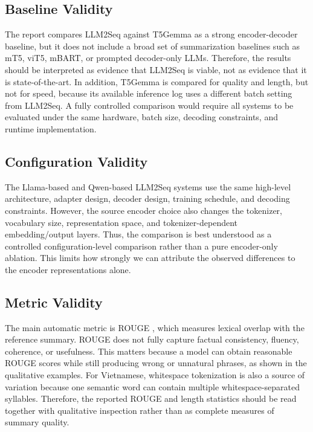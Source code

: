 \documentclass[11pt]{article}
\begin{document}
\subsection{Baseline Validity}

The report compares LLM2Seq against T5Gemma as a strong encoder-decoder baseline, but it does not include a broad set of summarization baselines such as mT5, viT5, mBART, or prompted decoder-only LLMs.
Therefore, the results should be interpreted as evidence that LLM2Seq is viable, not as evidence that it is state-of-the-art.
In addition, T5Gemma is compared for quality and length, but not for speed, because its available inference log uses a different batch setting from LLM2Seq.
A fully controlled comparison would require all systems to be evaluated under the same hardware, batch size, decoding constraints, and runtime implementation.

\subsection{Configuration Validity}

The Llama-based and Qwen-based LLM2Seq systems use the same high-level architecture, adapter design, decoder design, training schedule, and decoding constraints.
However, the source encoder choice also changes the tokenizer, vocabulary size, representation space, and tokenizer-dependent embedding/output layers.
Thus, the comparison is best understood as a controlled configuration-level comparison rather than a pure encoder-only ablation.
This limits how strongly we can attribute the observed differences to the encoder representations alone.

\subsection{Metric Validity}

The main automatic metric is ROUGE \citep{lin2004rouge}, which measures lexical overlap with the reference summary.
ROUGE does not fully capture factual consistency, fluency, coherence, or usefulness.
This matters because a model can obtain reasonable ROUGE scores while still producing wrong or unnatural phrases, as shown in the qualitative examples.
For Vietnamese, whitespace tokenization is also a source of variation because one semantic word can contain multiple whitespace-separated syllables.
Therefore, the reported ROUGE and length statistics should be read together with qualitative inspection rather than as complete measures of summary quality.
\end{document}
